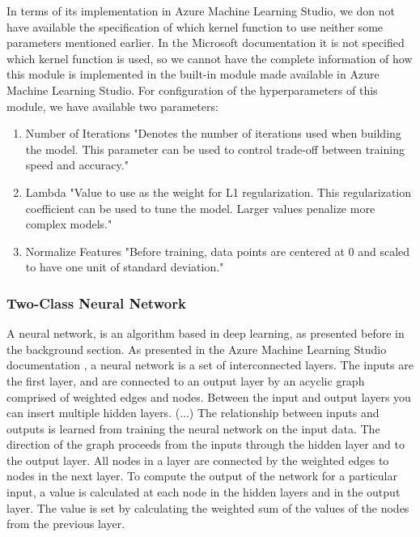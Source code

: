 In terms of its implementation in Azure Machine Learning Studio, we don not have available the specification of which kernel function to use neither some parameters mentioned earlier. In the Microsoft documentation it is not specified which kernel function is used, so we cannot have the complete information of how this module is implemented in the built-in module made available in Azure Machine Learning Studio.
For configuration of the hyperparameters of this module, we have available two parameters:
\begin{enumerate}
    \item{Number of Iterations}
"Denotes the number of iterations used when building the model. This parameter can be used to control trade-off between training speed and accuracy." \cite{AZURE_MACHINE_LEARNING}
    \item{Lambda}
"Value to use as the weight for L1 regularization. This regularization coefficient can be used to tune the model. Larger values penalize more complex models." \cite{AZURE_MACHINE_LEARNING}
    \item{Normalize Features}
"Before training, data points are centered at 0 and scaled to have one unit of standard deviation." \cite{AZURE_MACHINE_LEARNING}
\end{enumerate}

\subsubsection{Two-Class Neural Network}
A neural network, is an algorithm based in deep learning, as presented before in the background section. As presented in the Azure Machine Learning Studio documentation \cite{AZURE_MACHINE_LEARNING}, a neural network is a set of interconnected layers. The inputs are the first layer, and are connected to an output layer by an acyclic graph comprised of weighted edges and nodes. Between the input and output layers you can insert multiple hidden layers. (...) The relationship between inputs and outputs is learned from training the neural network on the input data. The direction of the graph proceeds from the inputs through the hidden layer and to the output layer. All nodes in a layer are connected by the weighted edges to nodes in the next layer.
To compute the output of the network for a particular input, a value is calculated at each node in the hidden layers and in the output layer. The value is set by calculating the weighted sum of the values of the nodes from the previous layer.

